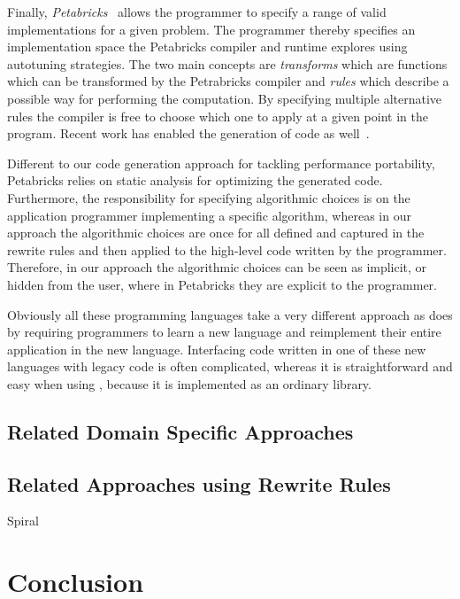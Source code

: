 \bigskip

Finally, \emph{Petabricks}~\cite{AnselCWOZEA09} allows the programmer to specify a range of valid implementations for a given problem.
The programmer thereby specifies an implementation space the Petabricks compiler and runtime explores using autotuning strategies.
The two main concepts are \emph{transforms} which are functions which can be transformed by the Petrabricks compiler and \emph{rules} which describe a possible way for performing the computation.
By specifying multiple alternative rules the compiler is free to choose which one to apply at a given point in the program.
Recent work has enabled the generation of \GPU code as well~\cite{PhothilimthanaARA13}.

Different to our code generation approach for tackling performance portability, Petabricks relies on static analysis for optimizing the generated code.
Furthermore, the responsibility for specifying algorithmic choices is on the application programmer implementing a specific algorithm, whereas in our approach the algorithmic choices are once for all defined and captured in the rewrite rules and then applied to the high-level code written by the programmer.
Therefore, in our approach the algorithmic choices can be seen as implicit, or hidden from the user, where in Petabricks they are explicit to the programmer.

\bigskip
Obviously all these programming languages take a very different approach as \SkelCL does by requiring programmers to learn a new language and reimplement their entire application in the new language.
Interfacing code written in one of these new languages with legacy code is often complicated, whereas it is straightforward and easy when using \SkelCL, because it is implemented as an ordinary \Cpp library.

\subsection{Related Domain Specific Approaches}


\subsection{Related Approaches using Rewrite Rules}
Spiral~\cite{OfenbeckRSOP13}

\section{Conclusion}


